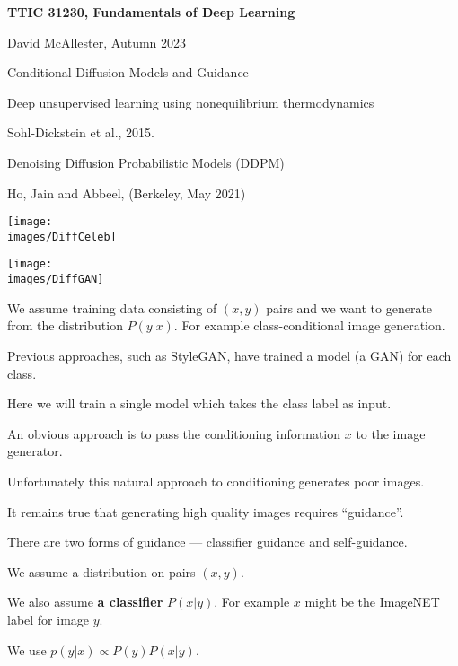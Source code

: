 





{\Huge

  \centerline{\bf TTIC 31230, Fundamentals of Deep Learning}
  \bigskip
  \centerline{David McAllester, Autumn 2023}
  \vfill
  \vfil
  \centerline{Conditional Diffusion Models and Guidance}
  \vfill
  \vfill


\centerline{Deep unsupervised learning using nonequilibrium thermodynamics}
\centerline{Sohl-Dickstein et al., 2015.}

\vfill
\centerline{Denoising Diffusion Probabilistic Models (DDPM)}
\centerline{Ho, Jain and Abbeel, (Berkeley, May 2021)}


\vfill
\centerline{\texttt{[image: \\images/DiffCeleb]}}


\vfill
\centerline{\texttt{[image: \\images/DiffGAN]}}


We assume training data consisting of $(x,y)$ pairs and we want to generate from the distribution $P(y|x)$.  For example class-conditional image generation.

\vfill
Previous approaches, such as StyleGAN, have trained a model (a GAN) for each class.

\vfill
Here we will train a single model which takes the class label as input.


An obvious approach is to pass the conditioning information $x$ to the image generator.

\vfill
Unfortunately this natural approach to conditioning generates poor images.

\vfill
It remains true that generating high quality images requires ``guidance''.

\vfill
There are two forms of guidance --- classifier guidance and self-guidance.

We assume a distribution on pairs $(x,y)$.

\vfill
We also assume {\bf a classifier} $P(x|y)$.  For example $x$ might be the ImageNET label for image $y$.

\vfill
We use $p(y|x) \propto P(y)P(x|y)$.

}
